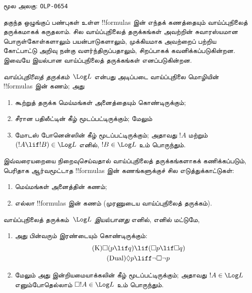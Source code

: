 \documentclass[11pt,a4paper,openany]{memoir}
\begin{document}

\clearpage
\noindent மூல அலகு: \texttt{OLP-0654}\par





தகுந்த ஒழுங்குப் பண்புகள் உள்ள !!{formula}s இன் எந்தக் கணத்தையும்
வாய்ப்புநிலைத் தருக்கமாகக் கருதலாம். சில வாய்ப்புநிலைத் தருக்கங்கள்
அவற்றின் சுவாரஸ்யமான பொருள்கோள்களாலும் பயன்பாடுகளாலும்,
முக்கியமாக அவற்றைப் பற்றிய கோட்பாட்டு அறிவு நன்கு வளர்ந்திருப்பதாலும்,
சிறப்பாகக் கவனிக்கப்படுகின்றன. இவையே இயல்பான வாய்ப்புநிலைத்
தருக்கங்கள் எனப்படுகின்றன.

\begin{defn}
\emph{வாய்ப்புநிலைத் தருக்கம்}~$\Log L$ என்பது அடிப்படை
வாய்ப்புநிலை மொழியின் !!{formula}s இன் கணம்; அது
\begin{enumerate}
\item கூற்றுத் தருக்க மெய்மங்கள் அனைத்தையும் கொண்டிருக்கும்;
\item சீரான பதிலீட்டின் கீழ் மூடப்பட்டிருக்கும்; மேலும்
\item மோடஸ் போனென்ஸின் கீழ் மூடப்பட்டிருக்கும்; அதாவது
  $!A$ மற்றும் $(!A \lif
  !B) \in \Log L$ எனில், $!B \in \Log L$ உம் பொருந்தும்.
\end{enumerate}
\end{defn}

\begin{ex}
இவ்வரையறையை நிறைவுசெய்வதால் வாய்ப்புநிலைத் தருக்கங்களாகக்
கணிக்கப்படும், பெரிதாக ஆர்வமூட்டாத !!{formula}s இன்
கணங்களுக்குச் சில எடுத்துக்காட்டுகள்:
\begin{enumerate}
\item மெய்மங்கள் அனைத்தின் கணம்;
\item எல்லா !!{formula}s இன் கணம் (முரணுடைய வாய்ப்புநிலைத் தருக்கம்).
\end{enumerate}
\end{ex}

\begin{defn}\label{defn:normal-modal-logic}
வாய்ப்புநிலைத் தருக்கம்~$\Log L$ \emph{இயல்பானது}
எனில், எனில் மட்டுமே,
\begin{enumerate}
\item அது பின்வரும் இரண்டையும் கொண்டிருக்கும்:
\begin{align}
\tag{K} \Box(p \lif q) & \lif (\Box p \lif \Box q) \\
\tag{Dual} \Diamond p & \liff \lnot \Box \lnot p
\end{align}
\item மேலும் அது இன்றியமையாக்கலின் கீழ் மூடப்பட்டிருக்கும்;
  அதாவது $!A \in
  \Log L$ எனும்போதெல்லாம் $ \Box !A \in \Log L$ உம் பொருந்தும்.
\end{enumerate}
\end{defn}
\end{document}
